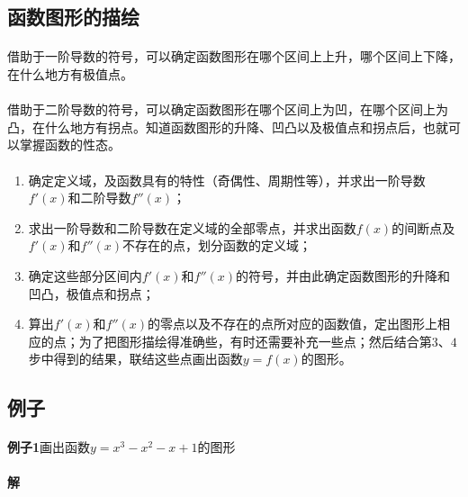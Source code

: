 \subsection{函数图形的描绘}
\paragraph{}
借助于一阶导数的符号，可以确定函数图形在哪个区间上上升，哪个区间上下降，在什么地方有极值点。
\paragraph{}
借助于二阶导数的符号，可以确定函数图形在哪个区间上为凹，在哪个区间上为凸，在什么地方有拐点。知道函数图形的升降、凹凸以及极值点和拐点后，也就可以掌握函数的性态。

\paragraph{}
\begin{enumerate}
  \item 确定定义域，及函数具有的特性（奇偶性、周期性等），并求出一阶导数$f'(x)$和二阶导数$f''(x)$；
  \item 求出一阶导数和二阶导数在定义域的全部零点，并求出函数$f(x)$的间断点及$f'(x)$和$f''(x)$不存在的点，划分函数的定义域；
  \item 确定这些部分区间内$f'(x)$和$f''(x)$的符号，并由此确定函数图形的升降和凹凸，极值点和拐点；
  \item 算出$f'(x)$和$f''(x)$的零点以及不存在的点所对应的函数值，定出图形上相应的点；为了把图形描绘得准确些，有时还需要补充一些点；然后结合第$3$、$4$步中得到的结果，联结这些点画出函数$y=f(x)$的图形。
\end{enumerate}

\subsection{例子}
\paragraph{}
\textbf{例子1\;}画出函数$y=x^3-x^2-x+1$的图形

\paragraph{}
\textbf{解}

